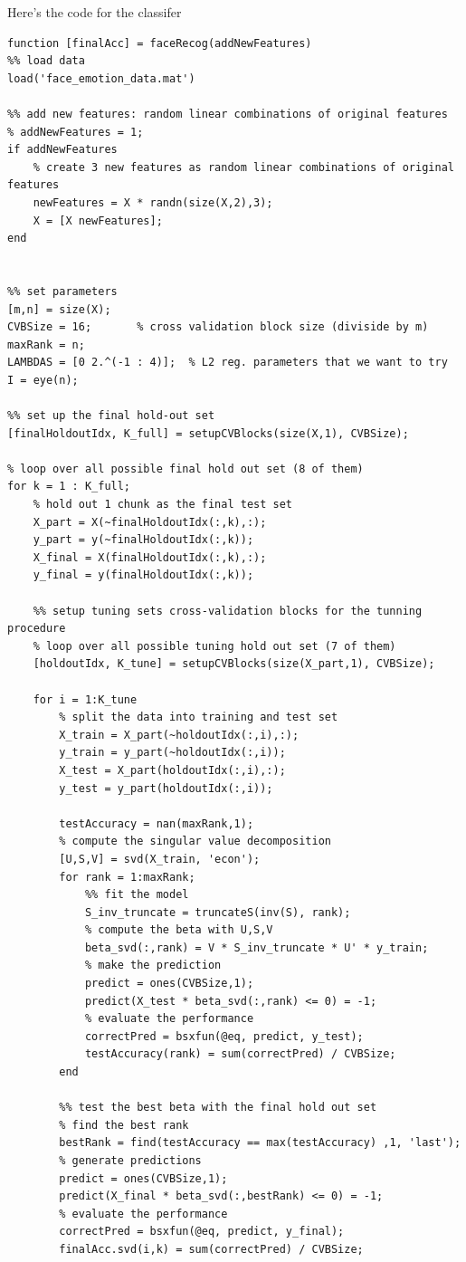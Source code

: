 \documentclass[paper=a4, fontsize=11pt]{scrartcl} %
\numberwithin{equation}{section} %
\numberwithin{figure}{section} %
\numberwithin{table}{section} %
\begin{document}
\newpage
Here's the code for the classifer 
\begin{lstlisting}
function [finalAcc] = faceRecog(addNewFeatures)
%% load data
load('face_emotion_data.mat')

%% add new features: random linear combinations of original features
% addNewFeatures = 1;
if addNewFeatures
    % create 3 new features as random linear combinations of original features
    newFeatures = X * randn(size(X,2),3);
    X = [X newFeatures];
end


%% set parameters
[m,n] = size(X);
CVBSize = 16;       % cross validation block size (diviside by m)
maxRank = n;
LAMBDAS = [0 2.^(-1 : 4)];  % L2 reg. parameters that we want to try
I = eye(n);

%% set up the final hold-out set
[finalHoldoutIdx, K_full] = setupCVBlocks(size(X,1), CVBSize);

% loop over all possible final hold out set (8 of them)
for k = 1 : K_full;
    % hold out 1 chunk as the final test set
    X_part = X(~finalHoldoutIdx(:,k),:);
    y_part = y(~finalHoldoutIdx(:,k));
    X_final = X(finalHoldoutIdx(:,k),:);
    y_final = y(finalHoldoutIdx(:,k));
    
    %% setup tuning sets cross-validation blocks for the tunning procedure
    % loop over all possible tuning hold out set (7 of them)
    [holdoutIdx, K_tune] = setupCVBlocks(size(X_part,1), CVBSize);
    
    for i = 1:K_tune
        % split the data into training and test set
        X_train = X_part(~holdoutIdx(:,i),:);
        y_train = y_part(~holdoutIdx(:,i));
        X_test = X_part(holdoutIdx(:,i),:);
        y_test = y_part(holdoutIdx(:,i));
        
        testAccuracy = nan(maxRank,1);
        % compute the singular value decomposition
        [U,S,V] = svd(X_train, 'econ');
        for rank = 1:maxRank;
            %% fit the model
            S_inv_truncate = truncateS(inv(S), rank);
            % compute the beta with U,S,V
            beta_svd(:,rank) = V * S_inv_truncate * U' * y_train;
            % make the prediction
            predict = ones(CVBSize,1);
            predict(X_test * beta_svd(:,rank) <= 0) = -1;
            % evaluate the performance
            correctPred = bsxfun(@eq, predict, y_test);
            testAccuracy(rank) = sum(correctPred) / CVBSize;
        end
        
        %% test the best beta with the final hold out set
        % find the best rank
        bestRank = find(testAccuracy == max(testAccuracy) ,1, 'last');
        % generate predictions 
        predict = ones(CVBSize,1);
        predict(X_final * beta_svd(:,bestRank) <= 0) = -1;
        % evaluate the performance
        correctPred = bsxfun(@eq, predict, y_final);
        finalAcc.svd(i,k) = sum(correctPred) / CVBSize;
        

\end{lstlisting}
\end{document}
